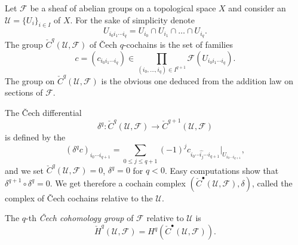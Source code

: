 \documentclass[12pt]{article}
\begin{document}
Let $\mathcal F$ be a sheaf of abelian groups on a topological space $X$ and consider an  $\mathcal U=\{U_i\}_{i\in I}$ of $X$. For the sake of simplicity denote
$$
U_{i_0i_1\cdots i_q}=U_{i_0}\cap U_{i_1}\cap\dots\cap U_{i_q}.
$$
The group $\check C^q(\mathcal U,\mathcal F)$ of \v{C}ech $q$-cochains is the set of families
$$
c=(c_{i_0i_1\cdots i_q})\in\prod_{(i_0,\dots,i_q)\in I^{q+1}}\mathcal F(U_{i_0i_1\cdots i_q}).
$$
The group  on $\check C^q(\mathcal U,\mathcal F)$ is the obvious one deduced from the addition law on sections of $\mathcal F$.

The \v{C}ech differential 
$$
\delta^q\colon\check C^q(\mathcal U,\mathcal F)\to\check C^{q+1}(\mathcal U,\mathcal F)
$$
is defined by the 
$$
(\delta^q c)_{i_0\cdots i_{q+1}}=\sum_{0\le j\le q+1}(-1)^j c_{i_0\cdots\widehat{i_j}\cdots i_{q+1}}|_{U_{i_0\cdots i_{q+1}}},
$$
and we set $\check C^{q}(\mathcal U,\mathcal F)=0$, $\delta^q=0$ for $q<0$.
Easy computations show that $\delta^{q+1}\circ\delta^q=0$. We get therefore a cochain complex $(\check C^\bullet(\mathcal U,\mathcal F),\delta)$, called the complex of \v{C}ech cochains relative to the  $\mathcal U$.

The $q$-th \emph{\v{C}ech cohomology group} of $\mathcal F$ relative to $\mathcal U$ is
$$
\check H^q(\mathcal U,\mathcal F)=H^q(\check C^\bullet(\mathcal U,\mathcal F)).
$$
\end{document}
